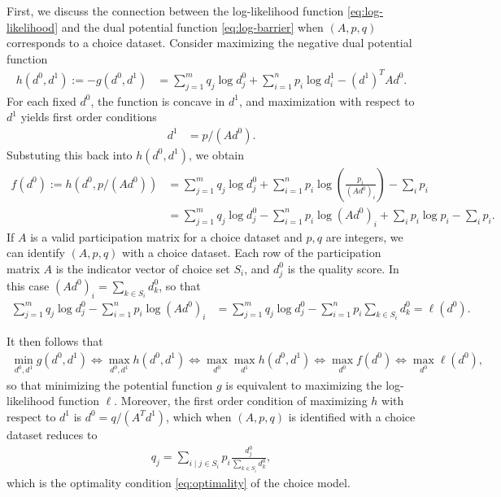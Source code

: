 First, we discuss the connection between the log-likelihood function
\eqref{eq:log-likelihood} and the dual potential function \eqref{eq:log-barrier} when $(A,p,q)$ corresponds to a choice dataset. Consider maximizing the negative
dual potential function 
\begin{align*}
h(d^{0},d^{1}):=-g(d^{0},d^{1}) & =\sum_{j=1}^{m}q_{j}\log d_{j}^{0}+\sum_{i=1}^{n}p_{i}\log d_{i}^{1}-(d^{1})^{T}Ad^{0}.
\end{align*}
For each fixed $d^{0}$, the function is concave in $d^{1}$, and
maximization with respect to $d^{1}$ yields first order conditions
\begin{align*}
d^{1} & =p/(Ad^{0}).
\end{align*}
Substuting this back into $h(d^{0},d^{1})$, we obtain 
\begin{align*}
f(d^{0}):=h(d^{0},p/(Ad^{0})) & =\sum_{j=1}^{m}q_{j}\log d_{j}^{0}+\sum_{i=1}^{n}p_{i}\log(\frac{p_{i}}{(Ad^{0})_{i}})-\sum_{i}p_{i}\\
 & =\sum_{j=1}^{m}q_{j}\log d_{j}^{0}-\sum_{i=1}^{n}p_{i}\log(Ad^{0})_{i}+\sum_{i}p_{i}\log p_{i}-\sum_{i}p_{i}.
\end{align*}
If $A$ is a valid participation matrix for a choice dataset and $p,q$
are integers, we can identify $(A,p,q)$ with a choice dataset. Each
row of the participation matrix $A$ is the indicator vector of choice
set $S_{i}$, and $d_{j}^{0}$ is the quality score. In this
case $(Ad^{0})_{i}=\sum_{k\in S_{i}}d_{k}^{0}$, so that 
\begin{align*}
\sum_{j=1}^{m}q_{j}\log d_{j}^{0}-\sum_{i=1}^{n}p_{i}\log(Ad^{0})_{i} & =\sum_{j=1}^{m}q_{j}\log d_{j}^{0}-\sum_{i=1}^{n}p_{i}\sum_{k\in S_{i}}d_{k}^{0}=\ell(d^{0}).
\end{align*}

It then follows that
\begin{align*}
\min_{d^{0},d^{1}}g(d^{0},d^{1})\Leftrightarrow\max_{d^{0},d^{1}}h(d^{0},d^{1})\Leftrightarrow\max_{d^{0}}\max_{d^{1}}h(d^{0},d^{1})\Leftrightarrow\max_{d^{0}}f(d^{0})\Leftrightarrow\max_{d^{0}}\ell(d^{0}),
\end{align*}
so that minimizing the potential function $g$ is equivalent to maximizing
the log-likelihood function $\ell$. Moreover, the first order condition of maximizing $h$ with respect to $d^1$ is 
$d^0=q/(A^Td^1)$, which when $(A,p,q)$ is identified with a choice dataset reduces to 
\begin{align*}
    q_j =\sum_{i\mid j\in S_i}p_i \frac{d^0_j}{\sum_{k\in S_i}d^0_k},
\end{align*}
which is the optimality condition \eqref{eq:optimality} of the choice model.


